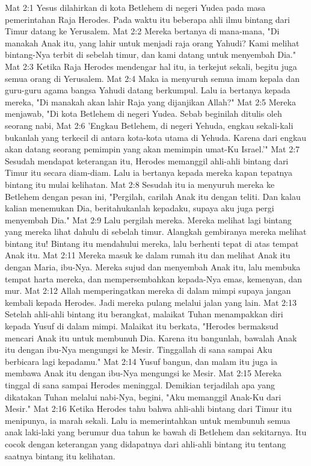 Mat 2:1  Yesus dilahirkan di kota Betlehem di negeri Yudea pada masa pemerintahan Raja Herodes. Pada waktu itu beberapa ahli ilmu bintang dari Timur datang ke Yerusalem.
Mat 2:2  Mereka bertanya di mana-mana, "Di manakah Anak itu, yang lahir untuk menjadi raja orang Yahudi? Kami melihat bintang-Nya terbit di sebelah timur, dan kami datang untuk menyembah Dia."
Mat 2:3  Ketika Raja Herodes mendengar hal itu, ia terkejut sekali, begitu juga semua orang di Yerusalem.
Mat 2:4  Maka ia menyuruh semua imam kepala dan guru-guru agama bangsa Yahudi datang berkumpul. Lalu ia bertanya kepada mereka, "Di manakah akan lahir Raja yang dijanjikan Allah?"
Mat 2:5  Mereka menjawab, "Di kota Betlehem di negeri Yudea. Sebab beginilah ditulis oleh seorang nabi,
Mat 2:6  'Engkau Betlehem, di negeri Yehuda, engkau sekali-kali bukanlah yang terkecil di antara kota-kota utama di Yehuda. Karena dari engkau akan datang seorang pemimpin yang akan memimpin umat-Ku Israel.'"
Mat 2:7  Sesudah mendapat keterangan itu, Herodes memanggil ahli-ahli bintang dari Timur itu secara diam-diam. Lalu ia bertanya kepada mereka kapan tepatnya bintang itu mulai kelihatan.
Mat 2:8  Sesudah itu ia menyuruh mereka ke Betlehem dengan pesan ini, "Pergilah, carilah Anak itu dengan teliti. Dan kalau kalian menemukan Dia, beritahukanlah kepadaku, supaya aku juga pergi menyembah Dia."
Mat 2:9  Lalu pergilah mereka. Mereka melihat lagi bintang yang mereka lihat dahulu di sebelah timur. Alangkah gembiranya mereka melihat bintang itu! Bintang itu mendahului mereka, lalu berhenti tepat di atas tempat Anak itu.
Mat 2:11  Mereka masuk ke dalam rumah itu dan melihat Anak itu dengan Maria, ibu-Nya. Mereka sujud dan menyembah Anak itu, lalu membuka tempat harta mereka, dan mempersembahkan kepada-Nya emas, kemenyan, dan mur.
Mat 2:12  Allah memperingatkan mereka di dalam mimpi supaya jangan kembali kepada Herodes. Jadi mereka pulang melalui jalan yang lain.
Mat 2:13  Setelah ahli-ahli bintang itu berangkat, malaikat Tuhan menampakkan diri kepada Yusuf di dalam mimpi. Malaikat itu berkata, "Herodes bermaksud mencari Anak itu untuk membunuh Dia. Karena itu bangunlah, bawalah Anak itu dengan ibu-Nya mengungsi ke Mesir. Tinggallah di sana sampai Aku berbicara lagi kepadamu."
Mat 2:14  Yusuf bangun, dan malam itu juga ia membawa Anak itu dengan ibu-Nya mengungsi ke Mesir.
Mat 2:15  Mereka tinggal di sana sampai Herodes meninggal. Demikian terjadilah apa yang dikatakan Tuhan melalui nabi-Nya, begini, "Aku memanggil Anak-Ku dari Mesir."
Mat 2:16  Ketika Herodes tahu bahwa ahli-ahli bintang dari Timur itu menipunya, ia marah sekali. Lalu ia memerintahkan untuk membunuh semua anak laki-laki yang berumur dua tahun ke bawah di Betlehem dan sekitarnya. Itu cocok dengan keterangan yang didapatnya dari ahli-ahli bintang itu tentang saatnya bintang itu kelihatan.
